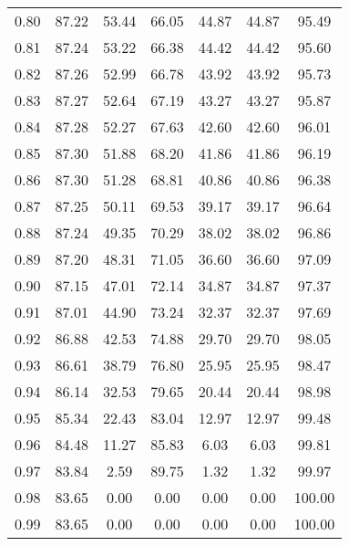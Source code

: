 \begin{tabular}{|c|c|c|c|c|c|c|}
      0.80 &     87.22 &     53.44 &      66.05 &   44.87 &      44.87 &         95.49 \\
      0.81 &     87.24 &     53.22 &      66.38 &   44.42 &      44.42 &         95.60 \\
      0.82 &     87.26 &     52.99 &      66.78 &   43.92 &      43.92 &         95.73 \\
      0.83 &     87.27 &     52.64 &      67.19 &   43.27 &      43.27 &         95.87 \\
      0.84 &     87.28 &     52.27 &      67.63 &   42.60 &      42.60 &         96.01 \\
      0.85 &     87.30 &     51.88 &      68.20 &   41.86 &      41.86 &         96.19 \\
      0.86 &     87.30 &     51.28 &      68.81 &   40.86 &      40.86 &         96.38 \\
      0.87 &     87.25 &     50.11 &      69.53 &   39.17 &      39.17 &         96.64 \\
      0.88 &     87.24 &     49.35 &      70.29 &   38.02 &      38.02 &         96.86 \\
      0.89 &     87.20 &     48.31 &      71.05 &   36.60 &      36.60 &         97.09 \\
      0.90 &     87.15 &     47.01 &      72.14 &   34.87 &      34.87 &         97.37 \\
      0.91 &     87.01 &     44.90 &      73.24 &   32.37 &      32.37 &         97.69 \\
      0.92 &     86.88 &     42.53 &      74.88 &   29.70 &      29.70 &         98.05 \\
      0.93 &     86.61 &     38.79 &      76.80 &   25.95 &      25.95 &         98.47 \\
      0.94 &     86.14 &     32.53 &      79.65 &   20.44 &      20.44 &         98.98 \\
      0.95 &     85.34 &     22.43 &      83.04 &   12.97 &      12.97 &         99.48 \\
      0.96 &     84.48 &     11.27 &      85.83 &    6.03 &       6.03 &         99.81 \\
      0.97 &     83.84 &      2.59 &      89.75 &    1.32 &       1.32 &         99.97 \\
      0.98 &     83.65 &      0.00 &       0.00 &    0.00 &       0.00 &        100.00 \\
      0.99 &     83.65 &      0.00 &       0.00 &    0.00 &       0.00 &        100.00 \\
\bottomrule
\end{tabular}
